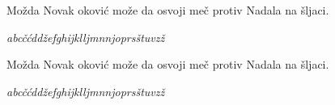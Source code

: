 \documentclass{article}
\begin{document}
Mo\v{z}da Novak \DJ{}okovi\'{c} mo\v{z}e da osvoji me\v{c} protiv Nadala na \v{s}ljaci.

\textit{abc\v c\'cdd\v z\dj efghijklljmnnjoprs\v stuvz\v z}
\\
\bigskip
{}\selectfont

Mo\v{z}da Novak \DJ{}okovi\'{c} mo\v{z}e da osvoji me\v{c} protiv Nadala na \v{s}ljaci.

\textit{abc\v c\'cdd\v z\dj efghijklljmnnjoprs\v stuvz\v z}
\end{document}
